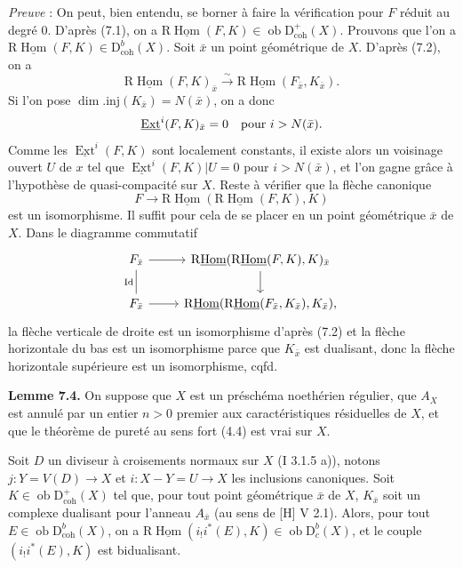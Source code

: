 \documentclass[11pt]{article}
\DeclareMathOperator{\Hom}{Hom}
\DeclareMathOperator{\Ext}{Ext}
\newcommand{\R}{\mathrm{R}}\newcommand{\RHomCore}{\mathrm{RHom}}
\newcommand{\D}{\mathrm{D}}
\newcommand{\ob}{\operatorname{ob}}
\providecommand{\Hom}{\operatorname{Hom}}
\providecommand{\ob}{\operatorname{ob}}
\providecommand{\R}{\mathrm R}
\providecommand{\Hom}{\operatorname{Hom}}
\begin{document}
\emph{Preuve} : On peut, bien entendu, se borner à faire la vérification pour $F$ réduit au degré $0$. D'après (7.1), on a $\R\underline{\Hom}(F,K)\in\ob\D^{+}_{\mathrm{coh}}(X)$. Prouvons que l'on a $\R\underline{\Hom}(F,K)\in\D^{b}_{\mathrm{coh}}(X)$. Soit $\bar{x}$ un point géométrique de $X$. D'après (7.2), on a
\[
        \R\underline{\Hom}(F,K)_{\bar{x}}\xrightarrow{\sim} \R\underline{\Hom}(F_{\bar{x}},K_{\bar{x}}).
\]
Si l'on pose $\dim.\mathrm{inj}(K_{\bar{x}})=N(\bar{x})$, on a donc
\[
        \underline{\Ext}^i(F,K)_{\bar{x}}=0\quad\hbox{pour }i>N(\bar{x}).
\]
Comme les $\underline{\Ext}^{i}(F,K)$ sont localement constants, il existe alors un voisinage ouvert $U$ de $x$ tel que $\underline{\Ext}^{i}(F,K)|U=0$ pour $i>N(\bar{x})$, et l'on gagne grâce à l'hypothèse de quasi-compacité sur $X$. Reste à vérifier que la flèche canonique
\[
        F\longrightarrow \R\underline{\Hom}(\R\underline{\Hom}(F,K),K)
\]
est un isomorphisme. Il suffit pour cela de se placer en un point géométrique $\bar{x}$ de $X$. Dans le diagramme commutatif
\[
\begin{tikzcd}
F_{\bar{x}} \arrow[r] \arrow[d,dash,"\mathrm{Id}"'] & \R\underline{\Hom}(\R\underline{\Hom}(F,K),K)_{\bar{x}} \arrow[d]\\
F_{\bar{x}} \arrow[r] & \R\underline{\Hom}(\R\underline{\Hom}(F_{\bar{x}},K_{\bar{x}}),K_{\bar{x}}),
\end{tikzcd}
\]
la flèche verticale de droite est un isomorphisme d'après (7.2) et la flèche horizontale du bas est un isomorphisme parce que $K_{\bar{x}}$ est dualisant, donc la flèche horizontale supérieure est un isomorphisme, cqfd.

\textbf{Lemme 7.4.} On suppose que $X$ est un préschéma noethérien régulier, que $A_X$ est annulé par un entier $n>0$ premier aux caractéristiques résiduelles 
de $X$, et que le théorème de
pureté au sens fort (4.4) est vrai sur $X$.

Soit $D$ un diviseur à croisements normaux sur $X$ (I 3.1.5 a)), notons $j:Y=V(D)\to X$ et $i:X-Y=U\to X$ les inclusions canoniques. Soit $K\in\ob\D^{+}_{\mathrm{coh}}(X)$ tel que, pour tout point géométrique $\bar{x}$ de $X$, $K_{\bar{x}}$ soit un complexe dualisant pour l'anneau $A_{\bar{x}}$ (au sens de [H] V 2.1). Alors, pour tout $E\in\ob\D^{b}_{\mathrm{coh}}(X)$, on a $\R\underline{\Hom}(i_!i^*(E),K)\in\ob\D^{b}_{c}(X)$, et le couple $(i_!i^*(E),K)$ est bidualisant.
\end{document}
